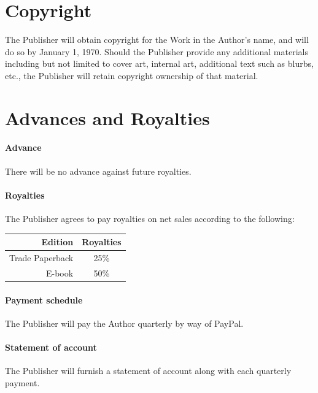 \documentclass[12pt,letterpaper]{article}
\def\PrintRoyalties{25\%}
\def\DigitalRoyalties{50\%}
\def\PaymentMechanism{PayPal} %
\def\CopyrightDate{January 1, 1970}
\begin{document}
\section{Copyright}

The Publisher will obtain copyright for the Work in the Author's name, and will do so by \CopyrightDate. Should the Publisher provide any additional materials including but not limited to cover art, internal art, additional text such as blurbs, etc., the Publisher will retain copyright ownership of that material.

\section{Advances and Royalties}

\paragraph{Advance}

There will be no advance against future royalties.

\paragraph{Royalties}

The Publisher agrees to pay royalties on net sales according to the following:

\begin{center}
\begin{tabular}{r c}
    \textbf{Edition} & \textbf{Royalties} \\ \hline
    Trade Paperback & \PrintRoyalties \\
    E-book & \DigitalRoyalties \\
    \hline
\end{tabular}
\end{center}

\paragraph{Payment schedule}

The Publisher will pay the Author quarterly by way of \PaymentMechanism.

\paragraph{Statement of account}

The Publisher will furnish a statement of account along with each quarterly payment.
\end{document}
